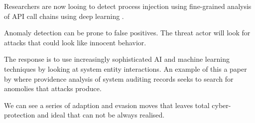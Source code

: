 Researchers are now looing to detect process injection using fine-grained analysis of API call chains using deep learning \autocite{Wang:2022}.

Anomaly detection can be prone to false positives.  The threat actor will look for attacks that could look like innocent behavior.

The response is to use increasingly sophisticated AI and machine learning techniques by looking at system entity interactions.
An example of this a paper by \textcite{Zengy:2022} where providence analysis of system auditing records seeks to search for anomolies
that attacks produce.

We can see a series of adaption and evasion moves that leaves total cyber-protection and ideal that can not be always realised. 












